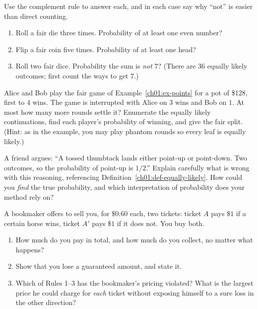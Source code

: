 \begin{exercise}
\label{ch01:ex-comp}
Use the complement rule to answer each, and in each case say why ``not'' is easier
than direct counting.
\begin{enumerate}
\item Roll a fair die three times. Probability of at least one even number?
\item Flip a fair coin five times. Probability of at least one head?
\item Roll two fair dice. Probability the sum is \emph{not} $7$? (There are $36$
equally likely outcomes; first count the ways to get $7$.)
\end{enumerate}
\end{exercise}

\begin{exercise}
\label{ch01:ex-points2}
Alice and Bob play the fair game of Example~\ref{ch01:ex-points} for a pot of
\$128, first to $4$ wins. The game is interrupted with Alice on $3$ wins and Bob on
$1$. At most how many more rounds settle it? Enumerate the equally likely
continuations, find each player's probability of winning, and give the fair split.
(Hint: as in the example, you may play phantom rounds so every leaf is equally
likely.)
\end{exercise}

\begin{exercise}
\label{ch01:ex-false-sym}
A friend argues: ``A tossed thumbtack lands either point-up or point-down. Two
outcomes, so the probability of point-up is $1/2$.'' Explain carefully what is
wrong with this reasoning, referencing Definition~\ref{ch01:def-equally-likely}.
How could you \emph{find} the true probability, and which interpretation of
probability does your method rely on?
\end{exercise}

\begin{exercise}
\label{ch01:ex-dutch}
A bookmaker offers to sell you, for $\$0.60$ each, two tickets: ticket $A$ pays
$\$1$ if a certain horse wins, ticket $A'$ pays $\$1$ if it does not. You buy both.
\begin{enumerate}
\item How much do you pay in total, and how much do you collect, no matter what
happens?
\item Show that you lose a guaranteed amount, and state it.
\item Which of Rules 1--3 has the bookmaker's pricing violated? What is the largest
price he could charge for \emph{each} ticket without exposing himself to a sure
loss in the other direction?
\end{enumerate}
\end{exercise}

